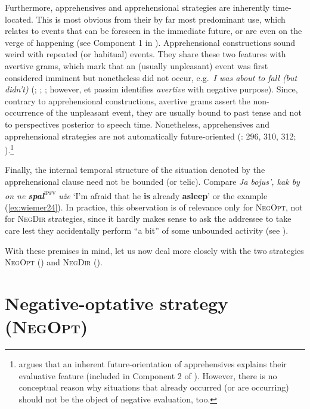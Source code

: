\documentclass[output=paper,colorlinks,citecolor=brown]{langscibook}
\begin{document}
 Furthermore, apprehensives and apprehensional strategies are inherently time-located. This is most obvious from their by far most predominant use, which relates to events that can be foreseen in the immediate future, or are even on the verge of happening (see Component 1 in ). Apprehensional constructions sound weird with repeated (or habitual) events. They share these two features with avertive grams, which mark that an (usually unpleasant) event was first considered imminent but nonetheless did not occur, e.g.\ \textit{I was about to fall (but didn't)} (\citealt{Kuteva1998}; \citealt{kutevaetal2019}; \citealt{Romaine2005}; however, \citealt[130]{Schmidtke-Bode2009} et passim identifies \textit{avertive} with negative purpose). Since, contrary to apprehensional constructions, avertive grams assert the non-occurrence of the unpleasant event, they are usually bound to past tense and not to perspectives posterior to speech time. Nonetheless, apprehensives and apprehensional strategies are not automatically future-oriented (\citealt{lichtenberk1995}: 296, 310, 312; \citealt{Bužarovska2017}).\footnote{\citet[17]{Plungian2004} argues that an inherent future-orientation of apprehensives explains their evaluative feature (included in Component 2 of ). However, there is no conceptual reason why situations that already occurred (or are occurring) should not be the object of negative evaluation, too.}

Finally, the internal temporal structure of the situation denoted by the apprehensional clause need not be bounded (or telic). Compare  \textit{Ja bojus', kak by on ne \textbf{spal}}\textsc{\textsuperscript{ipfv}} \textit{uže} `I'm afraid that he \textbf{is} already \textbf{asleep}' or the  example (\ref{ex:wiemer24}). In practice, this observation is of relevance only for \textsc{NegOpt}, not for \textsc{NegDir} strategies, since it hardly makes sense to ask the addressee to take care lest they accidentally perform ``a bit'' of some unbounded activity (see ).


With these premises in mind, let us now deal more closely with the two strategies \textsc{NegOpt} () and \textsc{NegDir} ().



\section{Negative-optative strategy (\textsc{NegOpt})} \label{sec:negopt}
\end{document}
